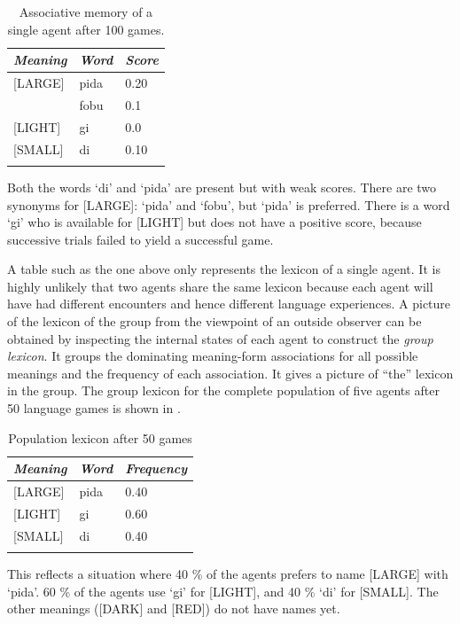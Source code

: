 \begin{table}
\begin{center}
\begin{tabular}{l  l  l }
\lsptoprule 
{\itshape Meaning} & {\itshape Word} & {\itshape Score} \\ \midrule
{}[LARGE]& pida& 0.20\\ 
  & fobu& 0.1\\ 
{}[LIGHT]& gi& 0.0\\ 
{}[SMALL]& di & 0.10\\ 
\lspbottomrule
\end{tabular}
\caption{\label{tab:t-mem3}Associative memory of a single agent after 100 games.}
\end{center}
\end{table}
Both the words `di' and `pida' are present but with 
weak scores. There are two synonyms for 
{}[LARGE]: `pida' and `fobu', but `pida' is 
preferred. There is a word `gi' who is available 
for [LIGHT] but does not have a positive score,
because successive trials failed to yield a successful game. 

A table such as the one above only represents the lexicon
of a single agent. It is highly unlikely that two agents
share the same lexicon because each agent will have 
had different encounters and hence different language
experiences. A picture of the lexicon of the group from the 
viewpoint of an outside observer can be obtained by
inspecting the internal states of each agent to 
construct the {\itshape group lexicon}. It groups the 
dominating meaning-form associations for all possible
meanings and the frequency of each association. 
It gives a picture of ``the'' lexicon 
in the group. The group lexicon
for the complete population of five agents after 50 language games
is shown in . 

\begin{table}
\begin{center}
\begin{tabular}{l  l  l }
\lsptoprule 
{\itshape Meaning}& {\itshape Word} & {\itshape Frequency} \\ \midrule 
{}[LARGE]& pida& 0.40\\ 
{}[LIGHT]& gi & 0.60\\ 
{}[SMALL]& di & 0.40\\ 
\lspbottomrule
\end{tabular}
\caption{\label{tab:t-mem4}Population lexicon after 50 games}
\end{center}
\end{table}
This reflects a situation where 40 \%
of the agents prefers to name [LARGE] with
`pida'. 60 \% of the agents
use `gi' for [LIGHT], and 40 \% `di' for [SMALL]. 
The other meanings ([DARK] and [RED]) do not have names yet. 

